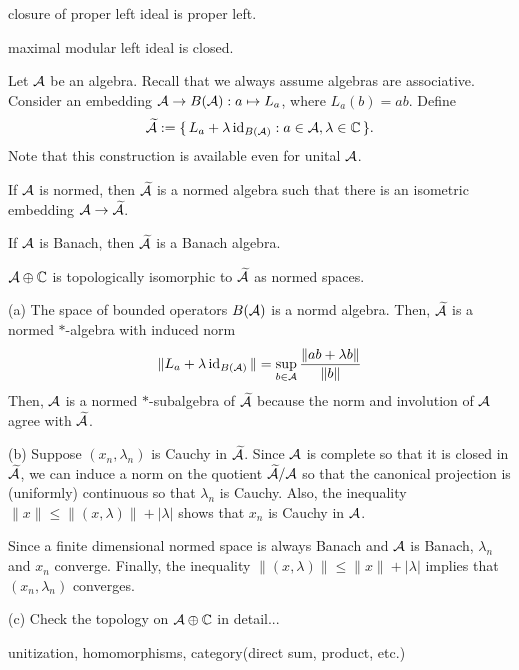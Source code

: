 \documentclass{../note}
\begin{document}
\begin{prb}
\begin{parts}
\item closure of proper left ideal is proper left.
\item maximal modular left ideal is closed.
\end{parts}
\end{prb}


\begin{prb}[Unitization]
Let $\mathcal{A}$ be an algebra.
Recall that we always assume algebras are associative.
Consider an embedding $\mathcal{A}\to B(\mathcal{A}):a\mapsto L_a$, where $L_a(b)=ab$.
Define
\[\widetilde{\mathcal{A}}:=\{\,L_a+\lambda\operatorname{id}_{B(\mathcal{A})}:a\in\mathcal{A},\lambda\in\mathbb{C}\,\}.\]
Note that this construction is available even for unital $\mathcal{A}$.
\begin{parts}
\item If $\mathcal{A}$ is normed, then $\widetilde{\mathcal{A}}$ is a normed algebra such that there is an isometric embedding $\mathcal{A}\to\widetilde{\mathcal{A}}$.
\item If $\mathcal{A}$ is Banach, then $\widetilde{\mathcal{A}}$ is a Banach algebra.
\item $\mathcal{A}\oplus\mathbb{C}$ is topologically isomorphic to $\widetilde{\mathcal{A}}$ as normed spaces.
\end{parts}
\end{prb}
\begin{pf}
(a)
The space of bounded operators $B(\mathcal{A})$ is a normd algebra.
Then, $\widetilde{\mathcal{A}}$ is a normed $*$-algebra with induced norm
\[\|L_a+\lambda\operatorname{id}_{B(\mathcal{A})}\|=\sup_{b\in\mathcal{A}}\frac{\|ab+\lambda b\|}{\|b\|}\]
Then, $\mathcal{A}$ is a normed $*$-subalgebra of $\widetilde{\mathcal{A}}$ because the norm and involution of $\mathcal{A}$ agree with $\widetilde{\mathcal{A}}$.

(b)
Suppose $(x_n,\lambda_n)$ is Cauchy in $\widetilde{\mathcal{A}}$.
Since $\mathcal{A}$ is complete so that it is closed in $\widetilde{\mathcal{A}}$, we can induce a norm on the quotient $\widetilde{\mathcal{A}}/\mathcal{A}$ so that the canonical projection is (uniformly) continuous so that $\lambda_n$ is Cauchy.
Also, the inequality $\|x\|\le\|(x,\lambda)\|+|\lambda|$ shows that $x_n$ is Cauchy in $\mathcal{A}$.

Since a finite dimensional normed space is always Banach and $\mathcal{A}$ is Banach, $\lambda_n$ and $x_n$ converge.
Finally, the inequality $\|(x,\lambda)\|\le\|x\|+|\lambda|$ implies that $(x_n,\lambda_n)$ converges.

(c)
Check the topology on $\mathcal{A}\oplus\mathbb{C}$ in detail...
\end{pf}



unitization, homomorphisms, category(direct sum, product, etc.)
\end{document}
